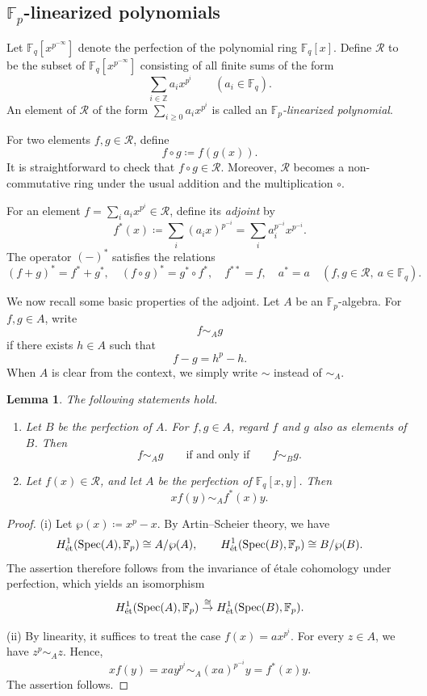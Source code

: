 \documentclass[12pt,a4paper]{amsart}
\newtheorem{lemma}[theorem]{Lemma}
\theoremstyle{definition}
\def\F{{\mathbb F}}
\def\Z{{\mathbb Z}}
\newcommand{\mc}{\mathcal}
\newcommand{\et}{\text{\'et}}
\theoremstyle{remark}
\begin{document}
\subsection{$\F_p$-linearized polynomials}
Let $\F_q[x^{p^{-\infty}}]$ denote the perfection of the polynomial ring $\F_q[x]$. Define $\mathcal R$ to be the subset of $\F_q[x^{p^{-\infty}}]$ consisting of all finite sums of the form 
\[
\sum_{i\in \Z}a_ix^{p^i} \qquad(a_i\in\F_q). 
\]
An element of $\mathcal R$ of the form $\sum_{i\geq0} a_i x^{p^i}$ is called an \emph{$\F_p$-linearized polynomial}. 


For two elements $f,g\in \mc R$, define  
\[
f\circ g\coloneqq f(g(x)). 
\]
It is straightforward to check that $f\circ g\in \mc R$. Moreover, $\mc R$ becomes a non-commutative ring under the usual addition and the multiplication $\circ$. 


For an element $f=\sum_i a_ix^{p^i}\in\mc R$,  define its \emph{adjoint} by
\[
f^\ast(x)\coloneqq\sum_{i} (a_i x)^{p^{-i}}=
\sum_{i} a_i^{p^{-i}} x^{p^{-i}}. 
\]
The operator $(-)^\ast$ satisfies the relations 
\[
(f+g)^\ast=f^\ast+g^\ast,\quad (f\circ g)^\ast=g^\ast\circ f^\ast,\quad f^{\ast\ast}=f,\quad a^\ast=a\quad(f,g\in\mc R,\ a\in\F_q). 
\]




We now recall some basic properties of the adjoint. 
Let $A$ be an $\F_{p}$-algebra. For $f,g\in A$, 
write 
\[
f\sim_A g
\]
if there exists $h\in A$ such that
\[
f-g=h^p - h. 
\]
When $A$ is clear from the context, we simply write $\sim$ instead of $\sim_A$.

\begin{lemma}\label{lem: basic property of sim}
The following statements hold. 
\begin{enumerate}
    \item Let $B$ be the perfection of $A$. For $f,g\in A$, regard $f$ and $g$ also as elements of $B$. Then 
    \[
    f\sim_A g\qquad\text{if and only if}\qquad f\sim_{B}g. 
    \]
\item Let $f(x)\in \mc R$, and let $A$ be the perfection of $\F_q[x,y]$. 
Then 
\[
xf(y)\sim_{A}f^\ast(x)y. 
\]
\end{enumerate}
\end{lemma}
\begin{proof}
    (i)  Let $\wp(x)\coloneqq x^p-x$. 
    By  Artin--Scheier theory, we have 
    \[
    H_\et^1({\rm Spec}(A),\F_p)\cong A/\wp(A),\qquad H_\et^1({\rm Spec}(B),\F_p)\cong B/\wp(B). 
    \]
    The assertion therefore follows from the invariance of \'etale cohomology under perfection, which yields an isomorphism 
    \[
    H_\et^1({\rm Spec}(A),\F_p)\overset{\cong}{\to}H_\et^1({\rm Spec}(B),\F_p). 
    \]

\noindent
     (ii) By linearity, it suffices to treat the case $f(x)=ax^{p^i}$. For every $z\in A$, we have $z^p\sim_A z$. Hence, 
     \[
     xf(y)=xay^{p^i}\sim_A(xa)^{p^{-i}}y=f^\ast(x)y. 
     \]
   The assertion follows. 
\end{proof}
\end{document}
